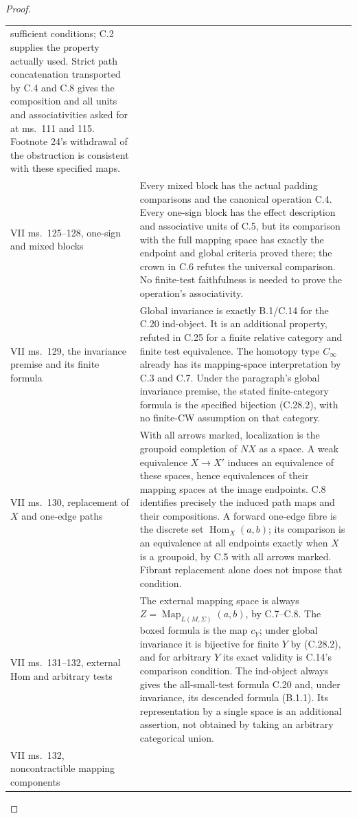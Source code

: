 \begin{proof}
\begin{longtable}{@{}p{}p{}@{}}
sufficient conditions; C.2 supplies the property actually used.
Strict path concatenation transported by C.4 and C.8 gives the
composition and all units and associativities asked for at
ms.~111 and 115. Footnote 24's withdrawal of the obstruction is
consistent with these specified maps.\\
VII ms.~125--128, one-sign and mixed blocks &
Every mixed block has the actual padding comparisons and the
canonical operation C.4. Every one-sign block has the effect
description and associative units of C.5, but its comparison
with the full mapping space has exactly the endpoint and
global criteria proved there; the crown in C.6 refutes the
universal comparison. No finite-test faithfulness is needed to
prove the operation's associativity.\\
VII ms.~129, the invariance premise and its finite formula &
Global invariance is exactly B.1/C.14 for the C.20 ind-object.
It is an additional property, refuted in C.25 for a finite
relative category and finite test equivalence. The homotopy
type $C_\infty$ already has its mapping-space interpretation
by C.3 and C.7. Under the paragraph's global invariance premise,
the stated finite-category formula is the specified bijection
(C.28.2), with no finite-CW assumption on that category.\\
VII ms.~130, replacement of $X$ and one-edge paths &
With all arrows marked, localization is the groupoid completion
of $NX$ as a space. A weak equivalence $X\to X'$ induces an
equivalence of these spaces, hence equivalences of their mapping
spaces at the image endpoints. C.8 identifies precisely the
induced path maps and their compositions. A forward one-edge
fibre is the discrete set $\operatorname{Hom}_X(a,b)$; its
comparison is an equivalence at all endpoints exactly when $X$
is a groupoid, by C.5 with all arrows marked. Fibrant replacement
alone does not impose that condition.\\
VII ms.~131--132, external Hom and arbitrary tests &
The external mapping space is always
$Z=\operatorname{Map}_{L(M,\Sigma)}(a,b)$, by C.7--C.8.
The boxed formula is the map $c_Y$; under global invariance it
is bijective for finite $Y$ by (C.28.2), and for arbitrary
$Y$ its exact validity is C.14's comparison condition. The
ind-object always gives the all-small-test formula C.20 and,
under invariance, its descended formula (B.1.1).
Its representation by a single space is an additional assertion,
not obtained by taking an arbitrary categorical union.\\
VII ms.~132, noncontractible mapping components &

\end{longtable}
\end{proof}
